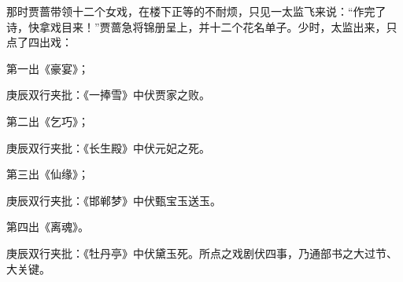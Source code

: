 \begin{parag}
    那时贾蔷带领十二个女戏，在楼下正等的不耐烦，只见一太监飞来说：“作完了诗，快拿戏目来！”贾蔷急将锦册呈上，并十二个花名单子。少时，太监出来，只点了四出戏：
\end{parag}


\begin{parag}
    第一出《豪宴》；\begin{note}庚辰双行夹批：《一捧雪》中伏贾家之败。\end{note}
\end{parag}


\begin{parag}
    第二出《乞巧》；\begin{note}庚辰双行夹批：《长生殿》中伏元妃之死。\end{note}
\end{parag}


\begin{parag}
    第三出《仙缘》；\begin{note}庚辰双行夹批：《邯郸梦》中伏甄宝玉送玉。\end{note}
\end{parag}


\begin{parag}
    第四出《离魂》。\begin{note}庚辰双行夹批：《牡丹亭》中伏黛玉死。所点之戏剧伏四事，乃通部书之大过节、大关键。\end{note}
\end{parag}


